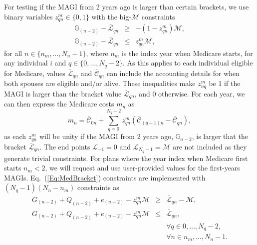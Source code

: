 \documentclass{report}[fleqn,12pt]
\begin{document}
        For testing if the MAGI from 2 years ago is larger than certain brackets,
	we use binary variables $z_{qn}^m \in \{0, 1\}$ with the big-$\mathcal{M}$ constraints
	\begin{eqnarray}
		\label{Eq:MedBracket}
                \mathbb{G}_{(n-2)} - \bar{\mathcal{L}}_{qn} & \geq & -(1 - z_{qn}^m) \mathcal{M}, \nonumber\\
                \mathbb{G}_{(n-2)} - \bar{\mathcal{L}}_{qn} & \leq & z_{qn}^m \mathcal{M},
	\end{eqnarray}
	for all $n \in \{n_m, \ldots, N_n-1\}$, where $n_{m}$ is the index year when
	Medicare starts, for any individual $i$ and $q \in \{0, \ldots, N_q -2\}$.
        As this applies to each individual eligible for Medicare, values
	$\bar{\mathcal{L}}_{qn}$ and  $\bar{\mathcal{C}}_{qn}$
	can include the accounting details for when both spouses are eligible and/or alive.
        These inequalities make $z_{nq}^m$ be 1 if
        the MAGI is larger than the bracket value $\bar{\mathcal{L}}_{qn}$, and 0 otherwise.
        For each year, we can then express the Medicare costs $m_n$ as
	\begin{equation}
		\label{Eq:MediCosts}
		m_n = \bar{\mathcal{C}}_{0n}
                + \sum_{q=0}^{N_q -2} z_{qn}^m (\bar{\mathcal{C}}_{(q+1)n} - \bar{\mathcal{C}}_{qn}),
	\end{equation}
	as each $z_{qn}^m$ will be unity if the MAGI from 2 years ago, $\mathbb{G}_{n-2}$,
        is larger that the bracket $\bar{\mathcal{L}}_{qn}$.
	The end points $\mathcal{L}_{-1} = 0$ and $\mathcal{L}_{N_q-1} = \mathcal{M}$ are not included
        as they generate trivial constraints.
	For plans where the year index when Medicare first starts $n_m<2$, we will request
	and use user-provided values for the first-years MAGIs.
	Eq.~(\ref{Eq:MedBracket}) constraints are implemented
	with $(N_q -1)(N_n - n_m)$ constraints as
	\begin{eqnarray}
		\label{Eq:MedBracket2}
		G_{(n-2)} + Q_{(n-2)} + e_{(n-2)} - z_{qn}^m \mathcal{M}
                & \geq & \bar{\mathcal{L}}_{qn} - \mathcal{M}, \nonumber\\
		G_{(n-2)} + Q_{(n-2)} + e_{(n-2)} - z_{qn}^m \mathcal{M}
                & \leq & \bar{\mathcal{L}}_{qn}, \nonumber\\
		&&\forall q \in {0, \ldots, N_q-2},\nonumber \\
		&&\forall n \in {n_m, \ldots, N_n-1}.
	\end{eqnarray}
\end{document}
